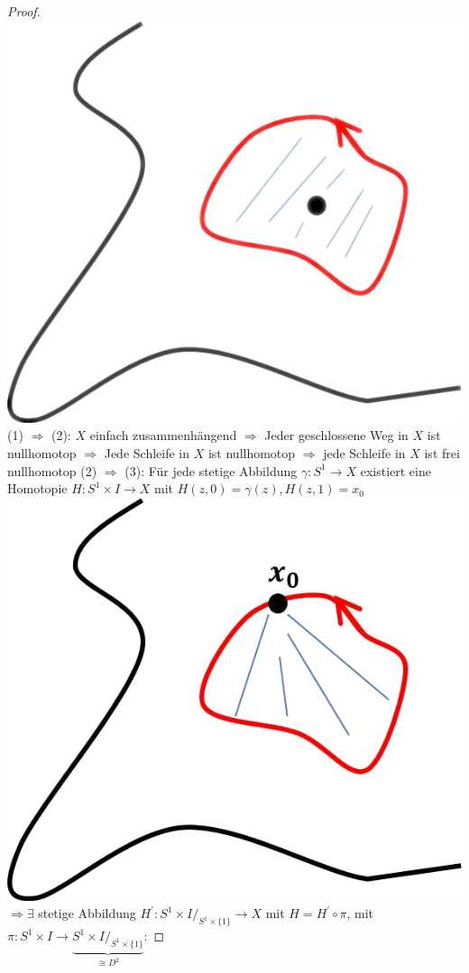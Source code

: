\documentclass[a4paper,11pt,notitlepage]{report}
\theoremstyle{definition}
\begin{document}
\begin{proof}
	\includegraphics[scale=0.4]{images/geschlossener_Weg_nullhomotop.png}
	\newline
	(1) $\Rightarrow$ (2): $X$ einfach zusammenhängend $\Rightarrow$ Jeder geschlossene Weg in $X$ ist nullhomotop $\Rightarrow$ Jede Schleife in $X$ ist nullhomotop $\Rightarrow$ jede Schleife in $X$ ist frei nullhomotop
	\newline
	(2) $\Rightarrow$ (3): Für jede stetige Abbildung $\gamma \colon S^1 \rightarrow X$ existiert eine Homotopie $H \colon S^1 \times I \rightarrow X$ mit $H(z,0) = \gamma(z), H(z,1) = x_0$ \newline \includegraphics[scale=0.4]{images/Schleife_frei_homotop.png} \newline $\Rightarrow \exists$ stetige Abbildung $H^\prime \colon S^1 \times I/_{S^1 \times \{1\}} \rightarrow X$ mit $H = H^\prime \circ \pi$, \newline mit $\pi \colon S^1 \times I \rightarrow \underbrace{S^1 \times I /_{S^1 \times \{1\}}}_{\cong D^2}$: \newline

\end{proof}
\end{document}
